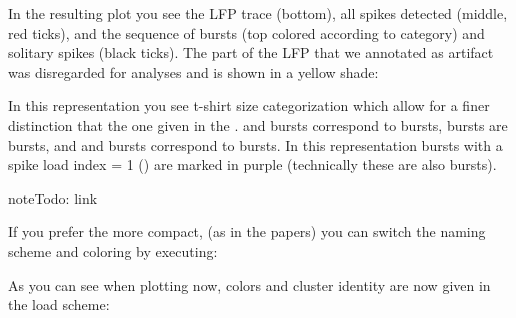 \documentclass[letterpaper,10pt,english]{sphinxmanual}
\let\sphinxpxdimen\pdfpxdimen\else\newdimen\sphinxpxdimen
\begin{document}
In the resulting plot you see the LFP trace (bottom), all spikes detected (middle, red ticks), and the sequence
of bursts (top colored according to category) and solitary spikes (black ticks). The part of the LFP that we
annotated as artifact was disregarded for analyses and is shown in a yellow shade:

\noindent{\hspace*{\fill}\sphinxincludegraphics[width=700\sphinxpxdimen]{{access_tshirt}.png}\hspace*{\fill}}

In this representation you see t-shirt size categorization which allow for a finer distinction that
the one given in the .  and  bursts correspond to  bursts,  bursts are  bursts,
and  and  bursts correspond to  bursts. In this representation bursts with a spike load index = 1
() are marked in purple (technically these are also  bursts).

\begin{sphinxadmonition}{note}{\label{access_results:index-0}Todo:}
 link
\end{sphinxadmonition}

If you prefer the more compact,  (as in the papers) you can switch the naming scheme
and coloring by executing:

%
\begin{sphinxVerbatim}[commandchars=\\\{\}]
\end{sphinxVerbatim}

As you can see when plotting now, colors and cluster identity are now given in the load scheme:

%
\begin{sphinxVerbatim}[commandchars=\\\{\}]
\PYG{p}{[}\PYG{p}{]}
\end{sphinxVerbatim}
\end{document}
